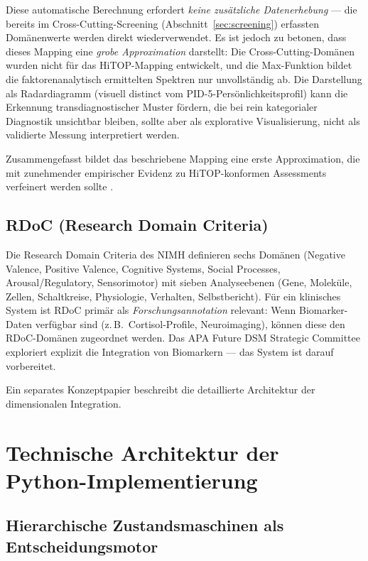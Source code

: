 \documentclass[11pt,a4paper]{article}
\begin{document}
Diese automatische Berechnung erfordert \textit{keine zus\"atzliche Datenerhebung} --- die bereits im Cross-Cutting-Screening (Abschnitt~\ref{sec:screening}) erfassten Dom\"anenwerte werden direkt wiederverwendet. Es ist jedoch zu betonen, dass dieses Mapping eine \textit{grobe Approximation} darstellt: Die Cross-Cutting-Dom\"anen wurden nicht f\"ur das HiTOP-Mapping entwickelt, und die Max-Funktion bildet die faktorenanalytisch ermittelten Spektren nur unvollst\"andig ab. Die Darstellung als Radardiagramm (visuell distinct vom PID-5-Pers\"onlichkeitsprofil) kann die Erkennung transdiagnostischer Muster f\"ordern, die bei rein kategorialer Diagnostik unsichtbar bleiben, sollte aber als explorative Visualisierung, nicht als validierte Messung interpretiert werden.

Zusammengefasst bildet das beschriebene Mapping eine erste Approximation, die mit zunehmender empirischer Evidenz zu HiTOP-konformen Assessments verfeinert werden sollte \citep{Kotov2021}.

\subsection{RDoC (Research Domain Criteria)}

Die Research Domain Criteria des NIMH \citep{Insel2010} definieren sechs Dom\"anen (Negative Valence, Positive Valence, Cognitive Systems, Social Processes, Arousal/Regulatory, Sensorimotor) mit sieben Analyseebenen (Gene, Molek\"ule, Zellen, Schaltkreise, Physiologie, Verhalten, Selbstbericht). F\"ur ein klinisches System ist RDoC prim\"ar als \textit{Forschungsannotation} relevant: Wenn Biomarker-Daten verf\"ugbar sind (z.\,B.\ Cortisol-Profile, Neuroimaging), k\"onnen diese den RDoC-Dom\"anen zugeordnet werden. Das APA Future DSM Strategic Committee exploriert explizit die Integration von Biomarkern --- das System ist darauf vorbereitet.

Ein separates Konzeptpapier beschreibt die detaillierte Architektur der dimensionalen Integration.


\section{Technische Architektur der Python-Implementierung}
\label{sec:technik}

\subsection{Hierarchische Zustandsmaschinen als Entscheidungsmotor}
\end{document}
